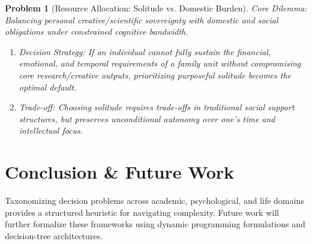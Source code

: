 \documentclass{article}
\newtheorem{problem}{Problem}
\begin{document}
\begin{problem}[Resource Allocation: Solitude vs. Domestic Burden]
	\emph{Core Dilemma:} Balancing personal creative/scientific sovereignty with domestic and social obligations under constrained cognitive bandwidth.
	\begin{enumerate}[label=(\roman*)]
		\item \emph{Decision Strategy:} If an individual cannot fully sustain the financial, emotional, and temporal requirements of a family unit without compromising core research/creative outputs, prioritizing purposeful solitude becomes the optimal default.
		\item \emph{Trade-off:} Choosing solitude requires trade-offs in traditional social support structures, but preserves unconditional autonomy over one's time and intellectual focus.
	\end{enumerate}
\end{problem}

\section{Conclusion \& Future Work}

Taxonomizing decision problems across academic, psychological, and life domains provides a structured heuristic for navigating complexity. Future work will further formalize these frameworks using dynamic programming formulations and decision-tree architectures.

\printbibliography[heading=bibintoc]
\end{document}
